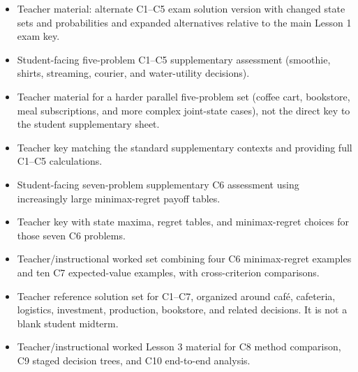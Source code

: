 \begin{itemize}
  \item {}

  Teacher material: alternate C1–C5 exam solution version with changed state sets and probabilities and expanded alternatives relative to the main Lesson 1 exam key.

  \item {}

  Student-facing five-problem C1–C5 supplementary assessment (smoothie, shirts, streaming, courier, and water-utility decisions).

  \item {}

  Teacher material for a harder parallel five-problem set (coffee cart, bookstore, meal subscriptions, and more complex joint-state cases), not the direct key to the student supplementary sheet.

  \item {}

  Teacher key matching the standard supplementary contexts and providing full C1–C5 calculations.

  \item {}

  Student-facing seven-problem supplementary C6 assessment using increasingly large minimax-regret payoff tables.

  \item {}

  Teacher key with state maxima, regret tables, and minimax-regret choices for those seven C6 problems.

  \item {}

  Teacher/instructional worked set combining four C6 minimax-regret examples and ten C7 expected-value examples, with cross-criterion comparisons.

  \item {}

  Teacher reference solution set for C1–C7, organized around café, cafeteria, logistics, investment, production, bookstore, and related decisions. It is not a blank student midterm.

  \item {}

  Teacher/instructional worked Lesson 3 material for C8 method comparison, C9 staged decision trees, and C10 end-to-end analysis.
\end{itemize}

